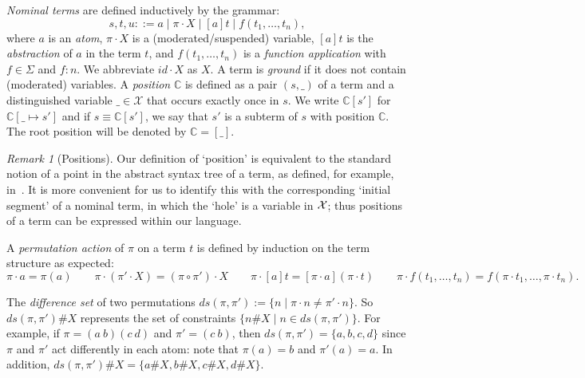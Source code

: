 \documentclass[submission,copyright,creativecommons]{eptcs}
\newcommand{\dani}[1]{\textcolor{orange}{#1}}
\newcommand{\pAction}[2]{#1\cdot #2}
\newcommand{\abs}[2]{[#1]#2}
\newcommand{\context}[1]{\mathbb{C}}
\theoremstyle{plain}
\theoremstyle{definition}
\newtheorem{definition}[theorem]{Definition}
\theoremstyle{remark}
\newtheorem{remark}[theorem]{Remark}
\begin{document}
{\em Nominal terms} are defined  inductively by the grammar:
 $$ s,t,u ::= a \mid \pAction{\pi}{X} \mid  \abs{a}{t} \mid f(t_1, \ldots, t_n),$$
where \(a\) is an {\em atom}, \(\pAction{\pi}{X}\) is a (moderated/suspended) variable, \(\abs{a}{t}\) is the {\em abstraction} of \(a\) in the term \(t\), and \(f(t_1, \ldots, t_n)\) is a {\em function application} with \(f \in \Sigma\) and \(f:n\).  We abbreviate $id\cdot X$ as $X$. A term is \textit{ground} if it does not contain (moderated) variables. 
A \emph{position} $\context{C}$ is defined as a pair $(s, \_)$ of a term and a distinguished variable $\_ \in \mathcal{X}$ that occurs exactly once in $s$. We write $\context{C}[s']$ for $\context{C}[\_ \mapsto s']$ and if $s\equiv \context{C}[s']$, we say that $s'$ is a subterm of $s$ with position $\context{C}$. The root position will be denoted by $\context{C} = [\_]$. 

\begin{remark}[Positions]
  Our definition of ‘position’ is equivalent to the standard notion of a point in the abstract syntax tree of a term, as defined, for example, in~\cite{Baader98}. It is more convenient for us to identify this with the corresponding ‘initial segment’ of a nominal term, in which the `hole' is a variable in ${\cal X}$; thus positions of a term can be expressed within our language.
\end{remark} 


     



A \emph{permutation action} of $\pi$ on a term $t$ is defined by induction on the term structure as expected:
$$\pi\cdot a = \pi(a) \qquad \pi \cdot (\pi'\cdot X) = (\pi \circ \pi')\cdot X \qquad \pi\cdot [a]t = [\pi\cdot a](\pi\cdot t) \qquad \pi\cdot f(t_1,\ldots, t_n) = f(\pi\cdot t_1, \ldots, \pi\cdot t_n).$$

The \emph{difference set} of two permutations
$ds(\pi,\pi') := \{ n \; | \; \pi\cdot n \neq \pi'\cdot n \}$. So $ds(\pi,\pi')\# X$ represents the set of constraints $\{ n\# X \; | \; n \in ds(\pi,\pi') \}$. For example, if $\pi = (a \ b)(c \ d)$ and $\pi' = (c \ b)$, then $ds(\pi,\pi') = \{a,b,c,d\}$ since $\pi$ and $\pi'$ act differently in each atom: note that $\pi(a)=b$ and $\pi'(a)=a$. In addition,  $ds(\pi,\pi')\# X = \{a\#X,b\#X,c\#X,d\#X\}$. 
\end{document}
